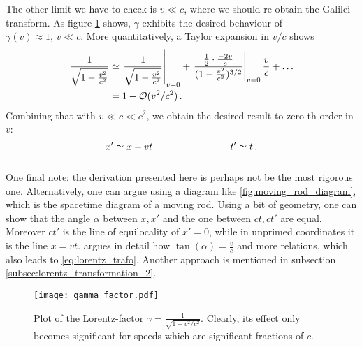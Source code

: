 The other limit we have to check is $v \ll c$, where we should re-obtain the Galilei transform. As figure \ref{fig:gamma_factor} shows, $\gamma$ exhibits the desired behaviour of $\gamma(v) \approx 1, \, v \ll c$. More quantitatively, a Taylor expansion in $v / c$ shows
\begin{align*}
\frac{1}{\sqrt{1 - \frac{v^2}{c^2}}} &\simeq \eval{\frac{1}{\sqrt{1 - \frac{v^2}{c^2}}}}_{v = 0} + \eval{\frac{\frac{1}{2} \cdot \frac{-2 v}{c}}{(1 - \frac{v^2}{c^2})^{3/2}}}_{v = 0} \frac{v}{c} + \dots
\\
&= 1 + \mathcal{O}(v^2 / c^2) \, .
\end{align*}
Combining that with $v \ll c \ll c^2$, we obtain the desired result to zero-th order in $v$:
\begin{equation*}
x' \simeq x - vt
\qquad \qquad \qquad \qquad
t' \simeq t
\, .
\end{equation*}\\



One final note: the derivation presented here is perhaps not be the most rigorous one. Alternatively, one can argue using a diagram like \ref{fig:moving_rod_diagram}, which is the spacetime diagram of a moving rod. Using a bit of geometry, one can show that the angle $\alpha$ between $x, x'$ and the one between $ct, ct'$ are equal. Moreover $ct'$ is the line of equilocality of $x' = 0$, while in unprimed coordinates it is the line $x = vt$. \cite{giulini_srt} argues in detail how $\tan(\alpha) = \frac{v}{c}$ and more relations, which also leads to \eqref{eq:lorentz_trafo}. Another approach is mentioned in subsection \ref{subsec:lorentz_transformation_2}.



\begin{figure}
	\centering
	
	\texttt{[image: gamma\_factor.pdf]}
	
	\caption{Plot of the Lorentz-factor $\gamma = \frac{1}{\sqrt{1 - v^2 / c^2}}$.	Clearly, its effect only becomes significant for speeds which are significant fractions of $c$.}
	\label{fig:gamma_factor}
\end{figure}



